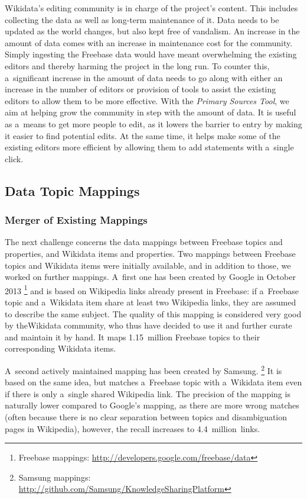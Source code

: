 \documentclass{sig-alternate-2013}
\begin{document}
Wikidata's editing community is in charge of the project's content. This includes collecting the
data as well as long-term maintenance of it. Data needs to be updated as the world changes, but also
kept free of vandalism. An increase in the amount of data comes with an increase in maintenance
cost for the community. Simply ingesting the Freebase data would have meant overwhelming the
existing editors and thereby harming the project in the long run. To counter this, a~significant
increase in the amount of data needs to go along with either an increase in the number of editors
or provision of tools to assist the existing editors to allow them to be more effective. With the
\emph{Primary Sources Tool}, we aim at helping grow the community in step with the amount of data. It is
useful as a~means to get more people to edit, as it lowers the barrier to entry by
making it easier to find potential edits. At the same time, it helps make some of the existing
editors more efficient by allowing them to add statements with a~single click.

\subsection{Data Topic Mappings}\label{subsec:topic-mappings}

\subsubsection{Merger of Existing Mappings}

The next challenge concerns the data mappings between Freebase topics and properties,
and Wikidata items and properties.
Two mappings between Freebase topics and Wikidata items were initially available,
and in addition to those, we worked on further mappings.
A~first one has been created by Google in October 2013%
\footnote{Freebase mappings: \url{http://developers.google.com/freebase/data}}
and is based on Wikipedia links already present in Freebase: if a~Freebase topic and
a~Wikidata item share at least two Wikipedia links, they are assumed to describe the same subject.
The quality of this mapping is considered very good by the\linebreak Wikidata community,
who thus have decided to use it and further curate and maintain it by hand.
It maps 1.15~million Freebase topics to their corresponding Wikidata items.

A~second actively maintained mapping has been created by Samsung.%
\footnote{Samsung mappings: \url{http://github.com/Samsung/KnowledgeSharingPlatform}}
It is based on the same idea, but matches a~Freebase topic with a~Wikidata item
even if there is only a~single shared Wikipedia link.
The precision of the mapping is naturally lower compared to Google's mapping,
as there are more wrong matches (often because there is no clear separation between topics
and disambiguation pages in Wikipedia), however, the recall increases to 4.4~million~links.
\end{document}

